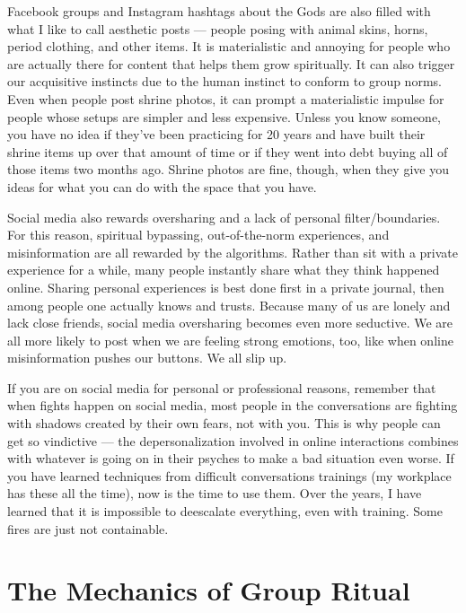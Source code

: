 \documentclass[
]{book}
\begin{document}
Facebook groups and Instagram hashtags about the Gods are also filled with what I like to call aesthetic posts --- people posing with animal skins, horns, period clothing, and other items. It is materialistic and annoying for people who are actually there for content that helps them grow spiritually. It can also trigger our acquisitive instincts due to the human instinct to conform to group norms. Even when people post shrine photos, it can prompt a materialistic impulse for people whose setups are simpler and less expensive. Unless you know someone, you have no idea if they've been practicing for 20 years and have built their shrine items up over that amount of time or if they went into debt buying all of those items two months ago. Shrine photos are fine, though, when they give you ideas for what you can do with the space that you have.

Social media also rewards oversharing and a lack of personal filter/boundaries. For this reason, spiritual bypassing, out-of-the-norm experiences, and misinformation are all rewarded by the algorithms. Rather than sit with a private experience for a while, many people instantly share what they think happened online. Sharing personal experiences is best done first in a private journal, then among people one actually knows and trusts. Because many of us are lonely and lack close friends, social media oversharing becomes even more seductive. We are all more likely to post when we are feeling strong emotions, too, like when online misinformation pushes our buttons. We all slip up.

If you are on social media for personal or professional reasons, remember that when fights happen on social media, most people in the conversations are fighting with shadows created by their own fears, not with you. This is why people can get so vindictive --- the depersonalization involved in online interactions combines with whatever is going on in their psyches to make a bad situation even worse. If you have learned techniques from difficult conversations trainings (my workplace has these all the time), now is the time to use them. Over the years, I have learned that it is impossible to deescalate everything, even with training. Some fires are just not containable.

\hypertarget{the-mechanics-of-group-ritual}{%
\section{The Mechanics of Group Ritual}\label{the-mechanics-of-group-ritual}}
\end{document}
